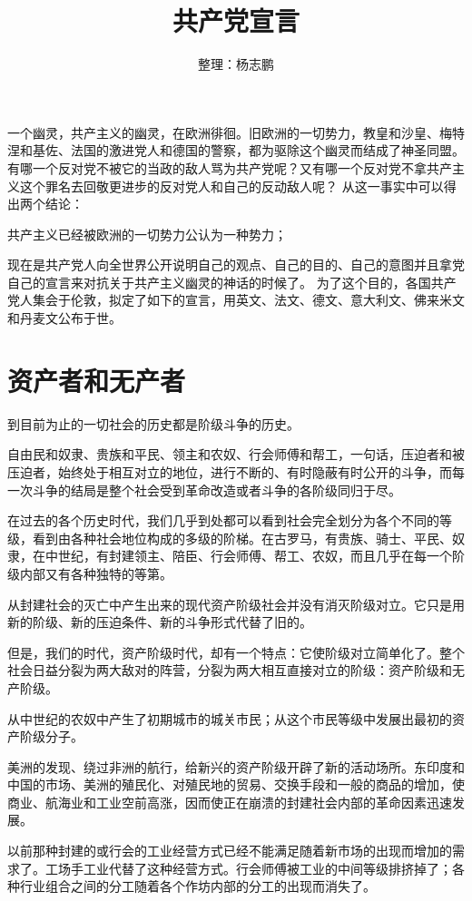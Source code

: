 \documentclass[UTF8]{ctexart}
\title{共产党宣言}
\author{整理：杨志鹏}
\date{}
\begin{document}
\maketitle
\pagestyle{fancy}
\tableofcontents{}
\newpage
\paragraph{}
一个幽灵，共产主义的幽灵，在欧洲徘徊。旧欧洲的一切势力，教皇和沙皇、梅特涅和基佐、法国的激进党人和德国的警察，都为驱除这个幽灵而结成了神圣同盟。
有哪一个反对党不被它的当政的敌人骂为共产党呢？又有哪一个反对党不拿共产主义这个罪名去回敬更进步的反对党人和自己的反动敌人呢？
从这一事实中可以得出两个结论：

共产主义已经被欧洲的一切势力公认为一种势力；

现在是共产党人向全世界公开说明自己的观点、自己的目的、自己的意图并且拿党自己的宣言来对抗关于共产主义幽灵的神话的时候了。
为了这个目的，各国共产党人集会于伦敦，拟定了如下的宣言，用英文、法文、德文、意大利文、佛来米文和丹麦文公布于世。
\section{资产者和无产者}
到目前为止的一切社会的历史都是阶级斗争的历史。

自由民和奴隶、贵族和平民、领主和农奴、行会师傅和帮工，一句话，压迫者和被压迫者，始终处于相互对立的地位，进行不断的、有时隐蔽有时公开的斗争，而每一次斗争的结局是整个社会受到革命改造或者斗争的各阶级同归于尽。

在过去的各个历史时代，我们几乎到处都可以看到社会完全划分为各个不同的等级，看到由各种社会地位构成的多级的阶梯。在古罗马，有贵族、骑士、平民、奴隶，在中世纪，有封建领主、陪臣、行会师傅、帮工、农奴，而且几乎在每一个阶级内部又有各种独特的等第。

从封建社会的灭亡中产生出来的现代资产阶级社会并没有消灭阶级对立。它只是用新的阶级、新的压迫条件、新的斗争形式代替了旧的。

但是，我们的时代，资产阶级时代，却有一个特点：它使阶级对立简单化了。整个社会日益分裂为两大敌对的阵营，分裂为两大相互直接对立的阶级：资产阶级和无产阶级。

从中世纪的农奴中产生了初期城市的城关市民；从这个市民等级中发展出最初的资产阶级分子。

美洲的发现、绕过非洲的航行，给新兴的资产阶级开辟了新的活动场所。东印度和中国的市场、美洲的殖民化、对殖民地的贸易、交换手段和一般的商品的增加，使商业、航海业和工业空前高涨，因而使正在崩溃的封建社会内部的革命因素迅速发展。

以前那种封建的或行会的工业经营方式已经不能满足随着新市场的出现而增加的需求了。工场手工业代替了这种经营方式。行会师傅被工业的中间等级排挤掉了；各种行业组合之间的分工随着各个作坊内部的分工的出现而消失了。
\end{document}
